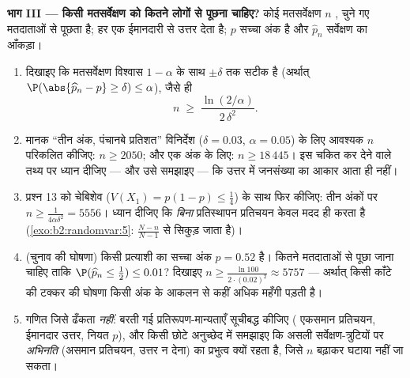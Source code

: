 \begin{problem}
\medskip
\noindent\textbf{भाग III --- किसी मतसर्वेक्षण को कितने लोगों से
पूछना चाहिए?} कोई मतसर्वेक्षण $n$ ,  चुने गए
मतदाताओं से पूछता है; हर एक ईमानदारी से उत्तर देता है; $p$ सच्चा
अंक है और $\widehat p_n$ सर्वेक्षण का आँकड़ा।
\begin{enumerate}[resume]
  \item दिखाइए कि मतसर्वेक्षण विश्वास $1 - \alpha$ के साथ $\pm\delta$ तक सटीक
        है (अर्थात् $\P(\abs{\widehat p_n - p} \geq \delta) \leq \alpha$), जैसे ही
        \[
        n \;\geq\; \frac{\ln(2/\alpha)}{2\,\delta^2} .
        \]
  \item मानक ``तीन अंक, पंचानबे प्रतिशत'' विनिर्देश ($\delta
        = 0.03$, $\alpha = 0.05$)
        के लिए आवश्यक $n$ परिकलित कीजिए: $n \geq 2050$; और एक अंक के
        लिए: $n \geq 18\,445$। इस चकित कर देने वाले तथ्य पर ध्यान दीजिए ---
        और उसे समझाइए --- कि उत्तर में जनसंख्या का आकार आता ही
        नहीं।
  \item प्रश्न 13 को चेबिशेव ($V(X_1) = p(1-p)
        \leq \frac14$) के साथ फिर कीजिए: तीन अंकों
        पर $n \geq \frac1{4\alpha\delta^2} =
        5556$। ध्यान दीजिए कि \emph{बिना} प्रतिस्थापन
        प्रतिचयन केवल मदद ही करता है (\cref{exo:b2:randomvar:5}:  $\frac{N-n}{N-1}$ से
        सिकुड़ जाता है)।
  \item (चुनाव की घोषणा) किसी प्रत्याशी का सच्चा अंक $p
        = 0.52$ है।
        कितने मतदाताओं से पूछा जाना चाहिए ताकि $\P(\widehat p_n \leq \tfrac12) \leq 0.01$? दिखाइए
        $n
        \geq \frac{\ln 100}{2\cdot(0.02)^2} \approx 5757$ --- अर्थात् किसी काँटे की टक्कर की घोषणा किसी अंक
        के आकलन से कहीं अधिक महँगी पड़ती है।
  \item गणित जिसे ढँकता \emph{नहीं}: बरती गई प्रतिरूपण-मान्यताएँ
        सूचीबद्ध कीजिए ( एकसमान प्रतिचयन, ईमानदार
        उत्तर, नियत $p$), और किसी छोटे अनुच्छेद में समझाइए कि
        असली सर्वेक्षण-त्रुटियों पर \emph{अभिनति} (असमान
        प्रतिचयन, उत्तर न देना) का प्रभुत्व क्यों रहता है,
        जिसे $n$ बढ़ाकर घटाया नहीं जा सकता।
\end{enumerate}


\end{problem}
